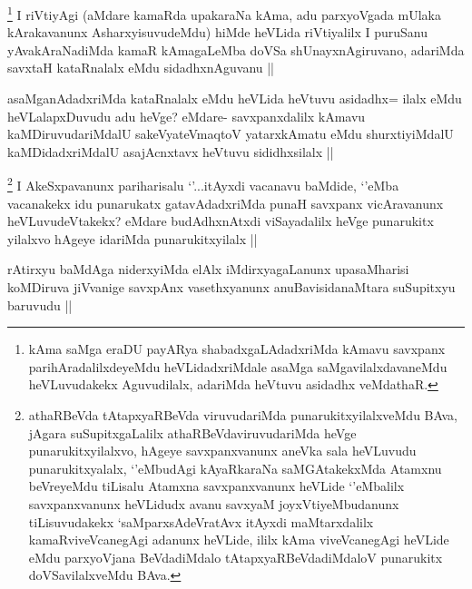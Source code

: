 
\begin{artha}
\footnote{kAma saMga eraDU payARya shabadxgaLAdadxriMda kAmavu savxpanx parihAradalilxdeyeMdu heVLidadxriMdale asaMga saMgavilalxdavaneMdu heVLuvudakekx Aguvudilalx, adariMda heVtuvu asidadhx veMdathaR.}
I riVtiyAgi (aMdare kamaRda upakaraNa kAma, adu parxyoVgada mUlaka kArakavanunx AsharxyisuvudeMdu) hiMde heVLida riVtiyalilx I puruSanu yAvakAraNadiMda kamaR kAmagaLeMba doVSa shUnayxnAgiruvano, adariMda savxtaH kataRnalalx eMdu sidadhxnAguvanu ||
\end{artha}


\begin{artha}
asaMganAdadxriMda kataRnalalx eMdu heVLida heVtuvu asidadhx= ilalx eMdu heVLalapxDuvudu adu heVge? eMdare- savxpanxdalilx kAmavu kaMDiruvudariMdalU sakeVyateV\s maqtoV yatarxkAmatu eMdu shurxtiyiMdalU kaMDidadxriMdalU asajAcnxtavx heVtuvu sididhxsilalx ||
\end{artha}


\begin{artha}
\footnote{athaRBeVda tAtapxyaRBeVda viruvudariMda punarukitxyilalxveMdu BAva, jAgara suSupitxgaLalilx athaRBeVdaviruvudariMda heVge punarukitxyilalxvo, hAgeye savxpanxvanunx aneVka sala heVLuvudu punarukitxyalalx, `\stext'eMbudAgi kAyaRkaraNa saMGAtakekxMda Atamxnu beVreyeMdu tiLisalu Atamxna savxpanxvanunx heVLide `\stext'eMbalilx savxpanxvanunx heVLidudx avanu savxyaM joyxVtiyeMbudanunx tiLisuvudakekx `saMparxsAdeVratAvx itAyxdi maMtarxdalilx kamaRviveVcanegAgi adanunx heVLide, ililx kAma viveVcanegAgi heVLide eMdu parxyoVjana BeVdadiMdalo tAtapxyaRBeVdadiMdaloV punarukitx doVSavilalxveMdu BAva.}
 I AkeSxpavanunx pariharisalu `\stext'...itAyxdi vacanavu baMdide, `\stext'eMba vacanakekx idu punarukatx gatavAdadxriMda punaH savxpanx vicAravanunx heVLuvudeVtakekx? eMdare budAdhxnAtxdi viSayadalilx heVge punarukitx yilalxvo hAgeye idariMda punarukitxyilalx ||
\end{artha}


\begin{artha}
rAtirxyu baMdAga niderxyiMda elAlx iMdirxyagaLanunx upasaMharisi koMDiruva jiVvanige savxpAnx vasethxyanunx anuBavisidanaMtara suSupitxyu baruvudu ||
\end{artha}

